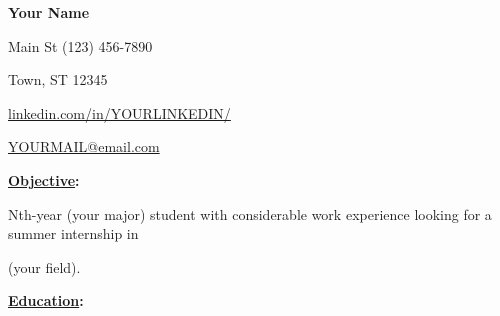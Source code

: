 \documentclass[11pt]{article}
\newcommand\textbox[1]{%
    \parbox{.333\textwidth}{#1}%
    }
\begin{document}
    \begin{center}\begin{Huge} \textbf{Your Name}\end{Huge}\end{center}

    \vspace{-5mm}
     Main St \hfill(123) 456-7890

    \vspace{-1mm}
    \noindent\textbox{Town, ST 12345\hfill}\textbox{\hfil \href{https://linkedin.com/in/YOURLINKEDIN/}{linkedin.com/in/YOURLINKEDIN/} \hfil}\textbox{\hfill \href{mailto:YOURMAIL@email.com}{YOURMAIL@email.com}}

    \vspace{-3.5mm}
    \noindent\hrulefill

    \vspace{-4mm}
    \noindent\hrulefill

    \noindent\begin{Large}\textbf{\underline{Objective}:} \end{Large}
    \vspace{1mm}
    
    Nth-year (your major) student with considerable work experience looking for a summer internship in 

    (your field).

    \vspace{2mm}
    \noindent\begin{Large}\textbf{\underline{Education}:} \end{Large}
    \vspace{1mm}
\end{document}
